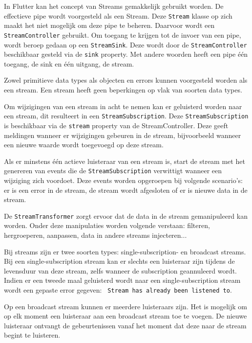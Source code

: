 In Flutter kan het concept van Streams gemakkelijk gebruikt worden. De effectieve pipe wordt voorgesteld als een Stream. Deze \verb|Stream| klasse op zich maakt het niet mogelijk om deze pipe te beheren.
Daarvoor wordt een \verb|StreamController| gebruikt. Om toegang te krijgen tot de invoer van een pipe, wordt beroep gedaan op een \verb|StreamSink|. Deze wordt door de \verb|StreamController| beschikbaar gesteld via de \verb|sink| property.
Met andere woorden heeft een pipe één toegang, de sink en één uitgang, de stream.

Zowel primitieve data types als objecten en errors kunnen voorgesteld worden als een stream. Een stream heeft geen beperkingen op vlak van soorten data types.

Om wijzigingen van een stream in acht te nemen kan er geluisterd worden naar een stream, dit resulteert in een \verb|StreamSubscription|. Deze \verb|StreamSubscription| is beschikbaar via de \verb|stream| property van de StreamController. Deze geeft meldingen wanneer er wijzigingen gebeuren in de stream, bijvoorbeeld wanneer een nieuwe waarde wordt toegevoegd op deze stream.

Als er minstens één actieve luisteraar van een stream is, start de stream met het genereren van events die de \verb|StreamSubscription| verwittigt wanneer een wijziging zich voordoet. Deze events worden opgeroepen bij volgende scenario's: er is een error in de stream, de stream wordt afgesloten of er is nieuwe data in de stream.

De \verb|StreamTransformer| zorgt ervoor dat de data in de stream gemanipuleerd kan worden. Onder deze manipulaties worden volgende verstaan: filteren, hergroeperen, aanpassen, data in andere streams injecteren...

Bij streams zijn er twee soorten types: single-subscription- en broadcast streams. Bij een single-subscription stream kan er slechts een luisteraar zijn tijdens de levensduur van deze stream, zelfs wanneer de subscription geannuleerd wordt. Indien er een tweede maal geluisterd wordt naar een single-subscription stream wordt een gepaste error gegeven: \verb| Stream has already been listened to|.

Op een broadcast stream kunnen er meerdere luisteraars zijn. Het is mogelijk om op elk moment een luisteraar aan een broadcast stream toe te voegen. De nieuwe luisteraar ontvangt de gebeurtenissen vanaf het moment dat deze naar de stream begint te luisteren.

